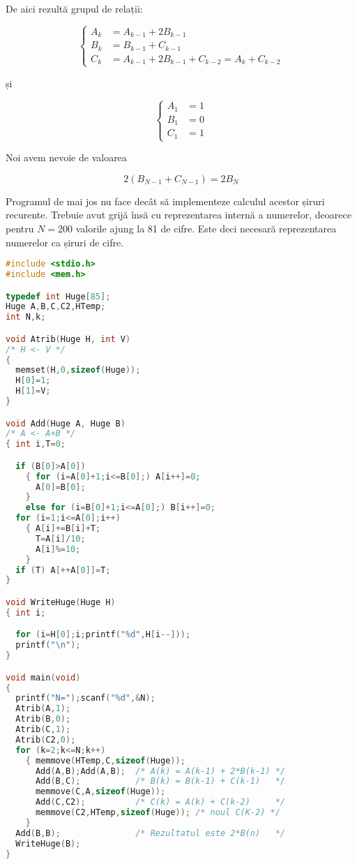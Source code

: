 De aici rezultă grupul de relații:

\begin{equation}
  \begin{cases}
    A_k & = A_{k - 1} + 2B_{k - 1} \\
    B_k & = B_{k - 1} + C_{k - 1} \\
    C_k & = A_{k - 1} + 2B_{k - 1} + C_{k - 2} = A_k + C_{k - 2}
  \end{cases}
\end{equation}

și

\begin{equation}
  \begin{cases}
    A_1 & = 1 \\
    B_1 & = 0 \\
    C_1 & = 1
  \end{cases}
\end{equation}

Noi avem nevoie de valoarea 

\begin{equation}
  2(B_{N-1} + C_{N-1}) = 2B_N
\end{equation}

Programul de mai jos nu face decât să implementeze calculul acestor șiruri
recurente. Trebuie avut grijă însă cu reprezentarea internă a numerelor,
deoarece pentru $N=200$ valorile ajung la 81 de cifre. Este deci necesară
reprezentarea numerelor ca șiruri de cifre.

\begin{lstlisting}[language=C]
#include <stdio.h>
#include <mem.h>

typedef int Huge[85];
Huge A,B,C,C2,HTemp;
int N,k;

void Atrib(Huge H, int V)
/* H <- V */
{
  memset(H,0,sizeof(Huge));
  H[0]=1;
  H[1]=V;
}

void Add(Huge A, Huge B)
/* A <- A+B */
{ int i,T=0;

  if (B[0]>A[0])
    { for (i=A[0]+1;i<=B[0];) A[i++]=0;
      A[0]=B[0];
    }
    else for (i=B[0]+1;i<=A[0];) B[i++]=0;
  for (i=1;i<=A[0];i++)
    { A[i]+=B[i]+T;
      T=A[i]/10;
      A[i]%=10;
    }
  if (T) A[++A[0]]=T;
}

void WriteHuge(Huge H)
{ int i;

  for (i=H[0];i;printf("%d",H[i--]));
  printf("\n");
}

void main(void)
{
  printf("N=");scanf("%d",&N);
  Atrib(A,1);
  Atrib(B,0);
  Atrib(C,1);
  Atrib(C2,0);
  for (k=2;k<=N;k++)
    { memmove(HTemp,C,sizeof(Huge));
      Add(A,B);Add(A,B);  /* A(k) = A(k-1) + 2*B(k-1) */
      Add(B,C);           /* B(k) = B(k-1) + C(k-1)   */
      memmove(C,A,sizeof(Huge));
      Add(C,C2);          /* C(k) = A(k) + C(k-2)     */
      memmove(C2,HTemp,sizeof(Huge)); /* noul C(K-2) */
    }
  Add(B,B);               /* Rezultatul este 2*B(n)   */
  WriteHuge(B);
}
\end{lstlisting}
